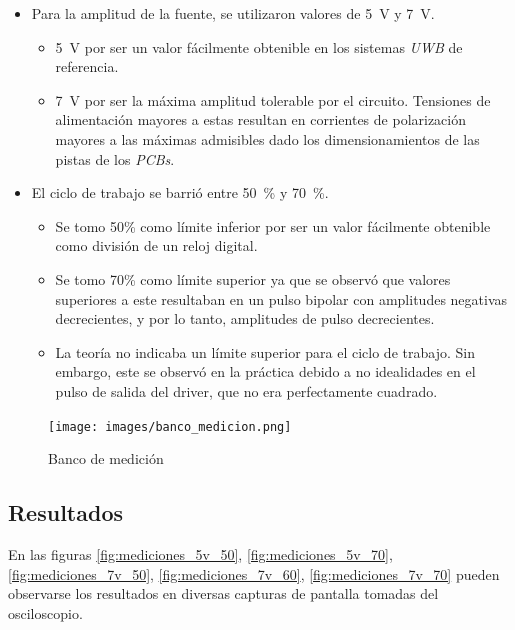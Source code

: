 \begin{itemize}
    \item Para la amplitud de la fuente, se utilizaron valores de \qty{5}{\volt} y
        \qty{7}{\volt}.
        \begin{itemize}
            \item \qty{5}{\volt} por ser un valor fácilmente obtenible en los
                sistemas \textit{UWB} de referencia.
            \item \qty{7}{\volt} por ser la máxima amplitud tolerable por el circuito.
                Tensiones de alimentación mayores a estas resultan en corrientes de
                polarización mayores a las máximas admisibles dado los
                dimensionamientos de las pistas de los \textit{PCBs}.
        \end{itemize}
    \item El ciclo de trabajo se barrió entre \qty{50}{\percent} y
        \qty{70}{\percent}.
        \begin{itemize}
            \item Se tomo 50\% como límite inferior por ser un valor fácilmente
                obtenible como división de un reloj digital.
            \item Se tomo 70\% como límite superior ya que se observó que valores
                superiores a este resultaban en un pulso bipolar con amplitudes
                negativas decrecientes, y por lo tanto, amplitudes de pulso
                decrecientes.
            \item La teoría no indicaba un límite superior para el ciclo de
                trabajo. Sin embargo, este se observó en la práctica debido a no
                idealidades en el pulso de salida del driver, que no era
                perfectamente cuadrado.
        \end{itemize}
\end{itemize}

\begin{figure}
  \centering
    \texttt{[image: images/banco\_medicion.png]}
    \caption{Banco de medición}
    \label{fig:banco_medicion}
\end{figure}

\subsection{Resultados}

En las figuras \ref{fig:mediciones_5v_50}, \ref{fig:mediciones_5v_70},
\ref{fig:mediciones_7v_50}, \ref{fig:mediciones_7v_60},
\ref{fig:mediciones_7v_70} pueden observarse los resultados en diversas capturas de pantalla
tomadas del osciloscopio.


